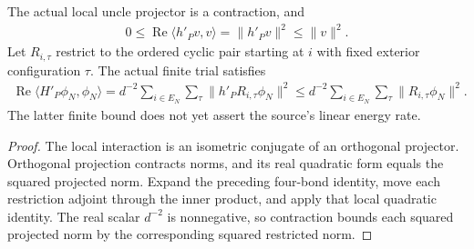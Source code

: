 \begin{lemma}
    \label{lem:uncle_trial_endpoint_quadratic_energy}
    \leanok
    The actual local uncle projector is a contraction, and
    \begin{align}
        0\le\operatorname{Re}\langle h'_P v,v\rangle
        =\|h'_P v\|^2\le\|v\|^2.
    \end{align}
    Let $R_{i,\tau}$ restrict to the ordered cyclic pair starting at $i$
    with fixed exterior configuration $\tau$. The actual finite trial satisfies
    \begin{align}
        \operatorname{Re}\langle H'_P\phi_N,\phi_N\rangle
        =d^{-2}\sum_{i\in E_N}\sum_\tau\|h'_P R_{i,\tau}\phi_N\|^2
        \le d^{-2}\sum_{i\in E_N}\sum_\tau\|R_{i,\tau}\phi_N\|^2.
    \end{align}
    The latter finite bound does not yet assert the source's linear energy rate.
\end{lemma}
\begin{proof}\leanok
    The local interaction is an isometric conjugate of an orthogonal projector.
    Orthogonal projection contracts norms, and its real quadratic form equals
    the squared projected norm. Expand the preceding four-bond identity,
    move each restriction adjoint through the inner product, and apply that
    local quadratic identity. The real scalar $d^{-2}$ is nonnegative,
    so contraction bounds each squared projected norm by the corresponding
    squared restricted norm.
\end{proof}

